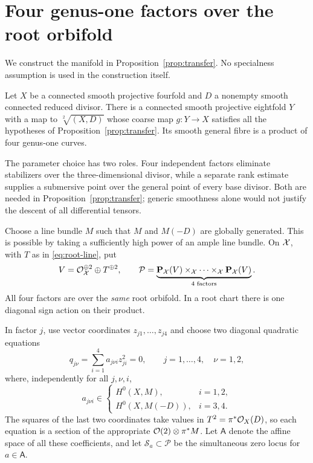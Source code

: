 \section{Four genus-one factors over the root orbifold}\label{sec:quadrics}

We construct the manifold in Proposition~\ref{prop:transfer}. No specialness assumption is used in the construction itself.

\begin{proposition}\label{prop:eightfold}
Let $X$ be a connected smooth projective fourfold and $D$ a nonempty smooth connected reduced divisor. There is a connected smooth projective eightfold $Y$ with a map to $\sqrt[2]{(X,D)}$ whose coarse map $g:Y\to X$ satisfies all the hypotheses of Proposition~\ref{prop:transfer}. Its smooth general fibre is a product of four genus-one curves.
\end{proposition}

The parameter choice has two roles. Four independent factors eliminate stabilizers over the three-dimensional divisor, while a separate rank estimate supplies a submersive point over the general point of every base divisor. Both are needed in Proposition~\ref{prop:transfer}; generic smoothness alone would not justify the descent of all differential tensors.

Choose a line bundle $M$ such that $M$ and $M(-D)$ are globally generated. This is possible by taking a sufficiently high power of an ample line bundle. On $\mathcal X$, with $T$ as in \eqref{eq:root-line}, put
\[
 V=\mathcal O_{\mathcal X}^{\oplus2}\oplus T^{\oplus2},\qquad
 \mathcal P=\underbrace{\mathbf P_{\mathcal X}(V)\times_{\mathcal X}\cdots\times_{\mathcal X}\mathbf P_{\mathcal X}(V)}_{4\text{ factors}}.
\]
All four factors are over the \emph{same} root orbifold. In a root chart there is one diagonal sign action on their product.

In factor $j$, use vector coordinates $z_{j1},\ldots,z_{j4}$ and choose two diagonal quadratic equations
\begin{equation}\label{eq:quadrics}
 q_{j\nu}=\sum_{i=1}^4a_{j\nu i}z_{ji}^2=0,
 \qquad j=1,\ldots,4,\quad \nu=1,2,
\end{equation}
where, independently for all $j,\nu,i$,
\[
 a_{j\nu i}\in
 \begin{cases}
 H^0(X,M),&i=1,2,\\
 H^0(X,M(-D)),&i=3,4.
 \end{cases}
\]
The squares of the last two coordinates take values in $T^2=\pi^*\mathcal O_X(D)$, so each equation is a section of the appropriate $\mathcal O(2)\otimes\pi^*M$. Let $\mathsf A$ denote the affine space of all these coefficients, and let $\mathcal S_a\subset\mathcal P$ be the simultaneous zero locus for $a\in\mathsf A$.

